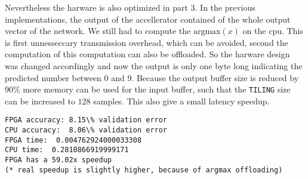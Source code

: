 \documentclass[../main.tex]{subfiles}
\begin{document}
Nevertheless the harware is also optimized in part 3. In the previous implementations, the output of the accellerator contained of the whole output vector of the network. We still had to compute the $\text{argmax}(x)$  on the cpu. This is first unnesseccary transmission overhead, which can be avoided, second the computation of this computation can also be offloaded. So the harware design was changed accordingly and now the output is only one byte long indicating the predicted number between 0 and 9. Because the output buffer size is reduced by $90\si{\percent}$ more memory can be used for the input buffer, such that the \texttt{TILING} size can be increased to $128$ samples. This also give a small latency speedup.

\begin{lstlisting}
FPGA accuracy: 8.15\% validation error
CPU accuracy:  8.06\% validation error
FPGA time:  0.004762924000033308
CPU time:  0.2810866919999171
FPGA has a 59.02x speedup 
(* real speedup is slightly higher, because of argmax offloading)
\end{lstlisting}
\end{document}
